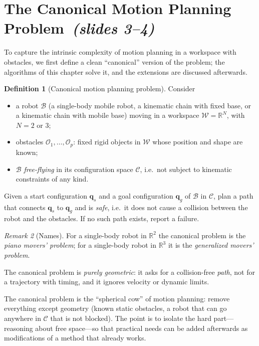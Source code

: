 \documentclass[11pt,a4paper]{article}
\newcommand{\Cspace}{\mathcal{C}}
\newcommand{\Wspace}{\mathcal{W}}
\newcommand{\Obs}{\mathcal{O}}
\newcommand{\Rob}{\mathcal{B}}
\newcommand{\R}{\mathbb{R}}
\newcommand{\qs}{\boldsymbol{q}_s}
\newcommand{\qg}{\boldsymbol{q}_g}
\newcommand{\slides}[1]{\emph{(slides #1)}}
\newcommand{\sect}[2]{\section{#1\texorpdfstring{\ \slides{#2}}{ (slides #2)}}}
\theoremstyle{definition}
\newtheorem{definition}{Definition}[section]
\theoremstyle{plain}
\theoremstyle{remark}
\newtheorem{remark}[definition]{Remark}
\begin{document}
\sect{The Canonical Motion Planning Problem}{3--4}

To capture the intrinsic complexity of motion planning in a workspace with obstacles, we first define a clean ``canonical'' version of the problem; the algorithms of this chapter solve it, and the extensions are discussed afterwards.

\begin{definition}[Canonical motion planning problem]
\label{def:canonical}
Consider
\begin{itemize}
  \item a robot $\Rob$ (a single-body mobile robot, a kinematic chain with fixed base, or a kinematic chain with mobile base) moving in a workspace $\Wspace=\R^N$, with $N=2$ or $3$;
  \item obstacles $\Obs_1,\dots,\Obs_p$: fixed rigid objects in $\Wspace$ whose position and shape are known;
  \item $\Rob$ \emph{free-flying} in its configuration space $\Cspace$, i.e.\ not subject to kinematic constraints of any kind.
\end{itemize}
Given a start configuration $\qs$ and a goal configuration $\qg$ of $\Rob$ in $\Cspace$, plan a path that connects $\qs$ to $\qg$ and is \emph{safe}, i.e.\ it does not cause a collision between the robot and the obstacles. If no such path exists, report a failure.
\end{definition}

\begin{remark}[Names]
For a single-body robot in $\R^2$ the canonical problem is the \emph{piano movers' problem}; for a single-body robot in $\R^3$ it is the \emph{generalized movers' problem}.
\end{remark}

The canonical problem is \emph{purely geometric}: it asks for a collision-free \emph{path}, not for a trajectory with timing, and it ignores velocity or dynamic limits.

\begin{intuition}
The canonical problem is the ``spherical cow'' of motion planning: remove everything except geometry (known static obstacles, a robot that can go anywhere in $\Cspace$ that is not blocked). The point is to isolate the hard part---reasoning about free space---so that practical needs can be added afterwards as modifications of a method that already works.
\end{intuition}
\end{document}
